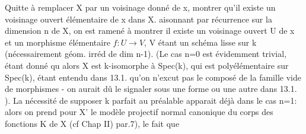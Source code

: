 Quitte à remplacer X par un voisinage donné de x,  
  montrer qu'il existe un voisinage ouvert élémentaire de x dans X.
  aisonnant par récurrence sur
la dimension n de X, on  est ramené à montrer  il existe
un voisinage ouvert U de x et un morphisme élémentaire $f: U\to V$,
V étant un schéma lisse sur k (nécessairement géom. irréd  de dim n-1).
 (Le cas n=0 est évidemment trivial, étant donné qu alors
X est k-isomorphe à Spec(k), qui est polyélémentaire sur Spec(k), étant
entendu dans 13.1. qu'on n'excut pas le composé de la famille vide de
morphismes - on aurait dû le signaler sous une forme ou une autre dans
13.1. ). La nécessité de supposer k parfait au préalable apparait déjà
dans le cas n=1: alors on prend pour X' le modèle projectif normal
canonique du corps des fonctions K de X (cf Chap II) par.7), le fait que


